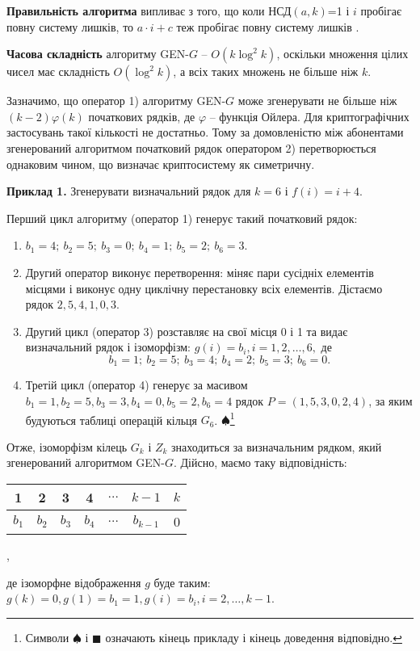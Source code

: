 \documentclass{ceurart}
\begin{document}
\textbf{Правильність алгоритма} випливає з того, що коли НСД\((a,k)\)=1
і \(i\) пробігає повну систему лишків, то \(a\cdot i + c\) теж пробігає
повну систему лишків \cite{6}.

\textbf{Часова складність} алгоритму GEN-\(G\) -- \(O(k\log^2 k)\),
оскільки множення цілих чисел має складність \(O(\log^2 k)\),
а всіх таких множень не більше ніж \(k\).

Зазначимо, що оператор 1) алгоритму GEN-\(G\) може згенерувати не
більше ніж \((k-2)\varphi(k)\) початкових рядків, де \(\varphi\) -- функція
Ойлера. Для криптографічних застосувань такої кількості не
достатньо. Тому за домовленістю між абонентами згенерований
алгоритмом початковий рядок оператором 2) перетворюється однаковим
чином, що визначає криптосистему як симетричну.

\vspace{0.15cm} %

{\footnotesize %
\textbf{Приклад 1.} Згенерувати визначальний рядок для
\(k=6\) і \(f(i)=i + 4\).

Перший цикл алгоритму (оператор 1) генерує такий початковий рядок:
\begin{flushleft} %
\begin{enumerate}
    \item \(b_1=4; \ b_2=5; \ b_3=0; \ b_4=1; \ b_5=2; \ b_6=3\).
    \item Другий оператор виконує перетворення: міняє пари сусідніх елементів
          місцями і виконує одну циклічну перестановку всіх елементів. Дістаємо
          рядок \(2,5,4,1,0,3\).
    \item Другий цикл (оператор 3) розставляє на свої місця 0 і 1 та
          видає визначальний рядок і ізоморфізм: \(g(i)=b_i, i=1,2,\ldots,6,\) де
          \[ b_1 = 1; \ b_2=5; \ b_3=4; \ b_4 = 2; \ b_5 = 3; \ b_6 = 0. \]
    \item Третій цикл (оператор 4) генерує за масивом \(b_1=1,
          b_2=5, b_3=3, b_4=0, b_5=2, b_6=4\) рядок \(P=(1,5,3,0,2,4)\), за яким
          будуються таблиці операцій кільця \(G_6\). $\spadesuit$\footnote{ Символи $\spadesuit$
          і $\blacksquare$ означають кінець прикладу і кінець доведення відповідно.}
\end{enumerate}
\end{flushleft}
} %

Отже, ізоморфізм кілець \(G_k\) і \(Z_k\) знаходиться за визначальним рядком,
який згенерований алгоритмом GEN-\(G\). Дійсно, маємо таку відповідність:
\begin{center}
{\footnotesize %
\begin{tabular}{|c@{}|c@{}|c@{}|c@{}|c@{}|c@{}|c@{}|}
\hline
 1 & 2     & 3       & 4           & \(\ldots\) & \(k-1\) & \(k\)\\
\hline
 \(b_1\) & \(b_2\) & \(b_3\) & \(b_4\) & \(\ldots\) & \(b_{k-1}\) & 0\\
\hline
\end{tabular} , }
\end{center}
де ізоморфне відображення \(g\) буде таким: \(g(k)=0, g(1)=b_1=1,
g(i)=b_i, i=2,\ldots, k-1\).
\end{document}
